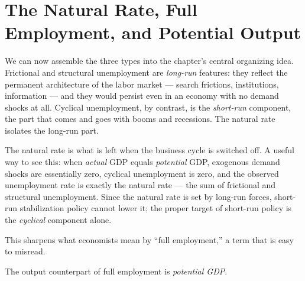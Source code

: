 \section{The Natural Rate, Full Employment, and Potential Output}

We can now assemble the three types into the chapter's central organizing idea. Frictional and structural unemployment are \emph{long-run} features: they reflect the permanent architecture of the labor market --- search frictions, institutions, information --- and they would persist even in an economy with no demand shocks at all. Cyclical unemployment, by contrast, is the \emph{short-run} component, the part that comes and goes with booms and recessions. The natural rate isolates the long-run part.


The natural rate is what is left when the business cycle is switched off. A useful way to see this: when \emph{actual} GDP equals \emph{potential} GDP, exogenous demand shocks are essentially zero, cyclical unemployment is zero, and the observed unemployment rate is exactly the natural rate --- the sum of frictional and structural unemployment. Since the natural rate is set by long-run forces, short-run stabilization policy cannot lower it; the proper target of short-run policy is the \emph{cyclical} component alone.

This sharpens what economists mean by ``full employment,'' a term that is easy to misread.


The output counterpart of full employment is \emph{potential GDP}.

